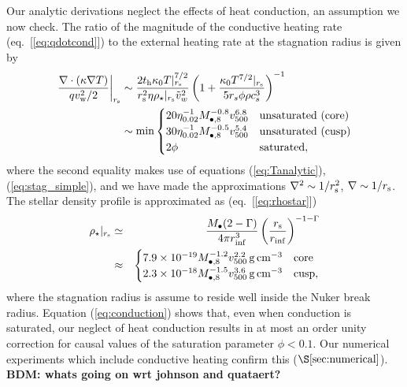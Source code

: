 \documentclass[usenatbib,fleqn]{mn2e}
\newcommand{\rs}{r_s}
\begin{document}
Our analytic derivations neglect the effects of heat conduction, an
assumption we now check.  The ratio of the magnitude of the conductive
heating rate (eq.~[\ref{eq:qdotcond}]) to the external heating rate at
the stagnation radius is given by
\begin{align}
  \left.\frac{\nabla\cdot(\kappa \nabla T)}{q v_{\rm
w}^{2}/2}\right|_{r_{\rm s}} &\sim \frac{2t_{\rm h}\kappa_0
T|_{r_{\rm s}}^{7/2}}{r_{\rm s}^{2}\eta \rho_{\star}|_{r_{\rm s}}
\tilde{v}_{w}^{2}}
 \left(1+\frac{\kappa_0 T^{7/2}|_{r_{\rm s}}}{5 \rs
    \phi \rho c_s^3}\right)^{-1}
\nonumber \\ &\sim {\rm min}
  \begin{cases}
  20 \eta_{0.02}^{-1}
M_{\bullet,8}^{-0.8} v_{500}^{6.8} &  \text{unsaturated (core)}\\
 30 \eta_{0.02}^{-1}
M_{\bullet,8}^{-0.5} v_{500}^{5.4} &  \text{unsaturated (cusp)}\\
  2 \phi & \text{saturated},
  \end{cases}
 \label{eq:conduction}
\end{align}
where the second equality makes use of equations (\ref{eq:Tanalytic}),
(\ref{eq:stag_simple}), and we have made the approximations $\nabla^{2} \sim
1/r_{\rm s}^{2}$, $\nabla \sim 1/r_{\rm s}$.  The
stellar density profile is approximated as (eq.~[\ref{eq:rhostar}])
\begin{eqnarray}
  \rho_{\star}|_{r_{\rm s}} &\simeq& \frac{M_{\bullet}(2-\Gamma)}{4\pi r_{\rm inf}^{3}}\left(\frac{r_{\rm s}}{r_{\rm inf}}\right)^{-1-\Gamma} \nonumber \\
 &\approx& \begin{cases}
    7.9 \times 10^{-19}M_{\bullet,8}^{-1.2}v_{500}^{2.2}\,{\rm g\,cm^{-3}}
    & \text{core} \\
    2.3 \times 10^{-18} M_{\bullet,8}^{-1.5}v_{500}^{3.6}
    \,{\rm g\,cm^{-3}}  & \text{cusp}, 
  \end{cases}
  \label{eq:rhostarrs}
\end{eqnarray}
where the stagnation radius is assume to reside well inside the Nuker
break radius.  Equation (\ref{eq:conduction}) shows that, even when
conduction is saturated, our neglect of heat conduction results in at
most an order unity correction for causal values of the saturation
parameter $\phi < 0.1$.  Our numerical experiments which include
conductive heating confirm this ($\S\ref{sec:numerical}$).  {\bf BDM: whats going on wrt johnson and quataert?}
\end{document}
